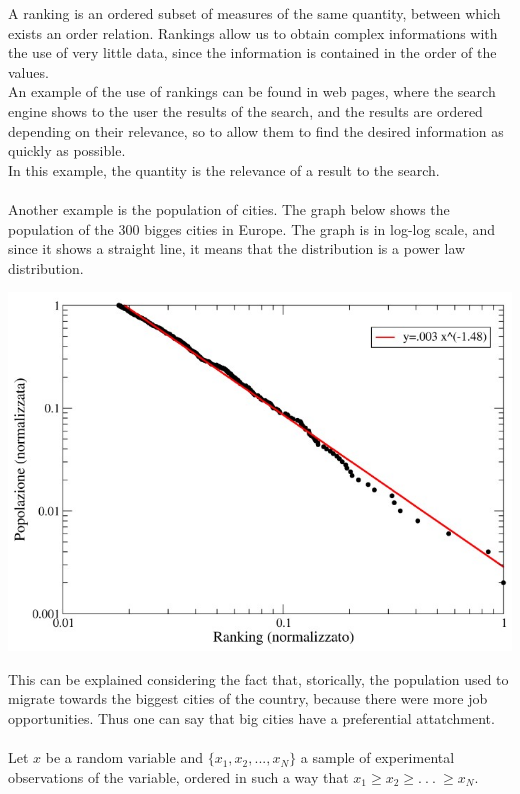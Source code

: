 A ranking is an ordered subset of measures of the same quantity, between which exists an order relation. Rankings allow us to obtain complex informations with the use of very little data, since the information is contained in the order of the values. \\ 
An example of the use of rankings can be found in web pages, where the search engine shows to the user the results of the search, and the results are ordered depending on their relevance, so to allow them to find the desired information as quickly as possible. \\
In this example, the quantity is the relevance of a result to the search. \\ \\
Another example is the population of cities. The graph below shows the population of the 300 bigges cities in Europe. The graph is in log-log scale, and since it shows a straight line, it means that the distribution is a power law distribution. \\
\begin{center}
	\includegraphics[scale=0.65]{m_physics_of_complex_systems/cities_ranking.jpg}
\end{center}
This can be explained considering the fact that, storically, the population used to migrate towards the biggest cities of the country, because there were more job opportunities. Thus one can say that big cities have a preferential attatchment. \\ \\ 
Let $x$ be a random variable and $\{x_1,x_2, . . . , x_N\}$ a sample of experimental observations of the variable, ordered in such a way that $x_1 \geq x_2 \geq . \ . \ . \ \geq x_N$. \\ 
